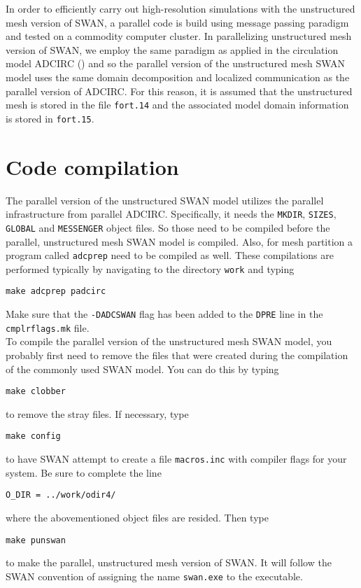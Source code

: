 \documentclass[12pt]{book}
\newcommand{\hl}[1]{\htmladdnormallink{{\it #1}}{#1}}
\begin{document}
 \label{ch:punswan}

In order to efficiently carry out high-resolution simulations with the unstructured mesh version of SWAN, a parallel code is build
using message passing paradigm and tested on a commodity computer cluster. In parallelizing unstructured mesh version of SWAN,
we employ the same paradigm as applied in the circulation model ADCIRC (\hl{http://www.adcirc.org}) and so the parallel version of the
unstructured mesh SWAN model uses the same domain decomposition and localized communication as the parallel version of ADCIRC.
For this reason, it is assumed that the unstructured mesh is stored in the file {\tt fort.14} and the associated model domain information
is stored in {\tt fort.15}.

\section{Code compilation}

The parallel version of the unstructured SWAN model utilizes the parallel infrastructure from parallel ADCIRC.
Specifically, it needs the {\tt MKDIR}, {\tt SIZES}, {\tt GLOBAL} and {\tt MESSENGER} object files.
So those need to be compiled before the parallel, unstructured mesh SWAN model is compiled. Also, for mesh partition
a program called {\tt adcprep} need to be compiled as well. These compilations are performed typically by navigating to
the directory {\tt work} and typing
\begin{verbatim}
make adcprep padcirc
\end{verbatim}
Make sure that the {\tt -DADCSWAN} flag has been added to the {\tt DPRE} line in the {\tt cmplrflags.mk} file.
\\[2ex]
\noindent
To compile the parallel version of the unstructured mesh SWAN model, you probably first need to remove the files that were created during
the compilation of the commonly used SWAN model. You can do this by typing
\begin{verbatim}
make clobber
\end{verbatim}
to remove the stray files. If necessary, type
\begin{verbatim}
make config
\end{verbatim}
to have SWAN attempt to create a file {\tt macros.inc} with compiler flags for your system.
Be sure to complete the line
\begin{verbatim}
O_DIR = ../work/odir4/
\end{verbatim}
where the abovementioned object files are resided. Then type
\begin{verbatim}
make punswan
\end{verbatim}
to make the parallel, unstructured mesh version of SWAN. It will follow the SWAN convention of assigning the name {\tt swan.exe} to the executable.
\end{document}
